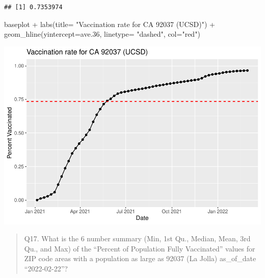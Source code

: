\documentclass[
]{article}
\newenvironment{Shaded}{\begin{snugshade}}{\end{snugshade}}
\newcommand{\AttributeTok}[1]{\textcolor[rgb]{0.77,0.63,0.00}{#1}}
\newcommand{\ConstantTok}[1]{\textcolor[rgb]{0.00,0.00,0.00}{#1}}
\newcommand{\FloatTok}[1]{\textcolor[rgb]{0.00,0.00,0.81}{#1}}
\newcommand{\FunctionTok}[1]{\textcolor[rgb]{0.00,0.00,0.00}{#1}}
\newcommand{\NormalTok}[1]{#1}
\newcommand{\OtherTok}[1]{\textcolor[rgb]{0.56,0.35,0.01}{#1}}
\newcommand{\SpecialCharTok}[1]{\textcolor[rgb]{0.00,0.00,0.00}{#1}}
\newcommand{\StringTok}[1]{\textcolor[rgb]{0.31,0.60,0.02}{#1}}
\begin{document}
\begin{Shaded}
\end{Shaded}

\begin{verbatim}
## [1] 0.7353974
\end{verbatim}

\begin{Shaded}
\begin{Highlighting}[]
\NormalTok{baseplot }\SpecialCharTok{+} \FunctionTok{labs}\NormalTok{(}\AttributeTok{title=} \StringTok{"Vaccination rate for CA 92037 (UCSD)"}\NormalTok{) }\SpecialCharTok{+} \FunctionTok{geom\_hline}\NormalTok{(}\AttributeTok{yintercept=}\NormalTok{ave}\FloatTok{.36}\NormalTok{, }\AttributeTok{linetype=} \StringTok{"dashed"}\NormalTok{, }\AttributeTok{col=}\StringTok{"red"}\NormalTok{)}
\end{Highlighting}
\end{Shaded}

\includegraphics{COVID-19-Vax-mini-project_files/figure-latex/unnamed-chunk-32-1.pdf}

\begin{quote}
Q17. What is the 6 number summary (Min, 1st Qu., Median, Mean, 3rd Qu.,
and Max) of the ``Percent of Population Fully Vaccinated'' values for
ZIP code areas with a population as large as 92037 (La Jolla)
as\_of\_date ``2022-02-22''?
\end{quote}
\end{document}
